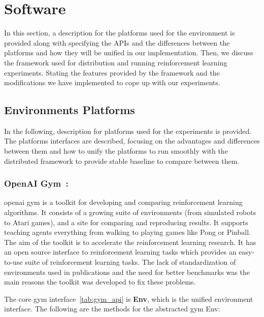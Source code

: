 \section{Software}
In this section, a description for the platforms used for the environment is provided along with specifying the APIs and the differences between the platforms and how they will be unified in our implementation. Then, we discuss the framework used for distribution and running reinforcement learning experiments. Stating the features provided by the framework and the modifications we have implemented to cope up with our experiments. 

\subsection{Environments Platforms}

In the following, description for platforms used for the experiments is provided. The platforms interfaces are described, focusing on the advantages and differences between them and how to unify the platforms to run smoothly with the distributed framework to provide stable baseline to compare between them.

\subsubsection{OpenAI Gym~\parencite{brockman2016openai}: } openai gym is a toolkit for developing and comparing reinforcement learning algorithms. It consists of a growing suite of environments (from simulated robots to Atari games), and a site for comparing and reproducing results. It supports teaching agents everything from walking to playing games like Pong or Pinball. The aim of the toolkit is to accelerate the reinforcement learning research. It has an open source interface to reinforcement learning tasks which provides an easy-to-use suite of reinforcement learning tasks. The lack of standardization of environments used in publications and the need for better benchmarks was the main reasons the toolkit was developed to fix these problems.

The core gym interface~\ref{tab:gym_api} is \textbf{Env}, which is the unified environment interface. 
The following are the methods for the abstracted gym Env:

